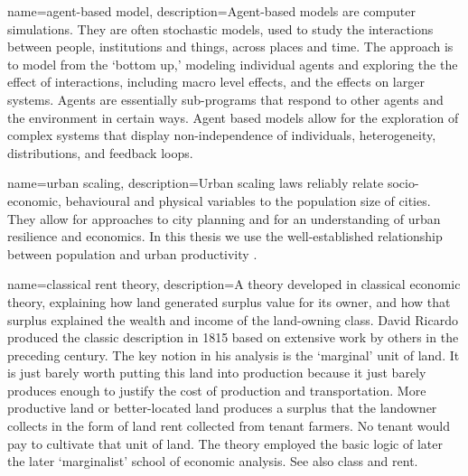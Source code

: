 {
name=agent-based model,
description={Agent-based models are computer simulations. They are often stochastic
models, used to study the interactions between people, institutions and things, across places and time. The approach is to model from the `bottom up,' modeling individual agents and exploring the the effect of interactions, including macro level effects, and the effects on larger systems. %
Agents are essentially sub-programs that respond to other agents and the environment in certain ways. %
Agent based models allow for the exploration of complex systems that display non-independence of individuals, heterogeneity, distributions,  and \gls{feedback} loops. %
}
}

{
name=urban scaling,
description={Urban scaling laws reliably relate socio-economic, behavioural and physical variables to the population size of cities. They allow for approaches  to city planning and for an understanding of urban resilience and economics. In this thesis we use the well-established relationship between population and urban productivity \cite{GET_doi:10.1098/rsif.2020.0705}}.
}

{
name=classical rent theory,
description={A theory developed in \gls{classical economic theory}, explaining how land generated surplus value for its owner, and how that surplus explained the wealth and income of the land-owning class. David Ricardo produced the classic description in 1815 based on extensive work  %
by others in the preceding century. The key notion in his analysis is the `marginal' unit of land. It is just barely worth putting this land into production because it just barely produces enough to justify the cost of production and transportation. More productive land or better-located land produces a surplus that the landowner collects in the form of land rent collected from tenant farmers. No tenant would pay to cultivate that unit of land. The theory employed the basic logic of later the later `marginalist' school of economic analysis. See also \gls{class} and \gls{rent}.}
}

